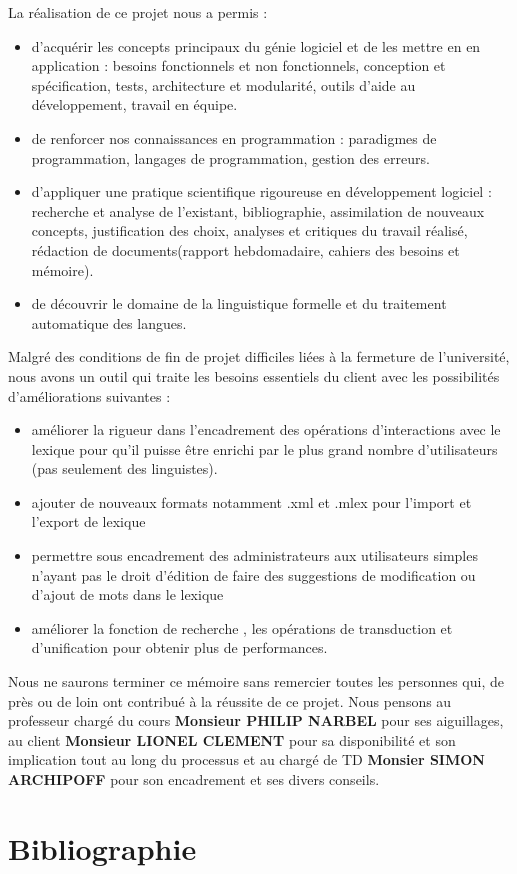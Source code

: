 \documentclass[a4paper, 12pt]{article}
\begin{document}
{La réalisation de ce projet nous a permis :
\begin{itemize}
    \item d'acquérir les concepts principaux du génie logiciel et de les mettre en en application : besoins fonctionnels et non fonctionnels, conception et spécification, tests, architecture et modularité, outils d'aide au développement, travail en équipe.
    \item de renforcer nos connaissances en programmation : paradigmes de programmation, langages de programmation, gestion des erreurs.
    \item d'appliquer une pratique scientifique rigoureuse en développement logiciel : recherche et analyse de l'existant, bibliographie, assimilation de nouveaux concepts, justification des choix, analyses et critiques du travail réalisé, rédaction de documents(rapport hebdomadaire, cahiers des besoins et mémoire).
    \item de découvrir le domaine de la linguistique formelle et du traitement automatique des langues. 
    \end{itemize}{}\par}
{Malgré des conditions de fin de projet difficiles liées à la fermeture de l'université, nous avons un outil qui traite les besoins essentiels du client avec les possibilités d'améliorations suivantes :
    \begin{itemize}
        \item améliorer la rigueur dans l'encadrement des opérations d'interactions avec le lexique pour qu'il puisse être enrichi par le plus grand nombre d'utilisateurs (pas seulement des linguistes). 
        \item ajouter de nouveaux formats notamment .xml et .mlex pour l'import et l'export de lexique
        \item permettre sous encadrement des administrateurs aux utilisateurs simples n'ayant pas le droit d'édition  de faire des suggestions de modification ou d'ajout de mots dans le lexique 
        \item améliorer la fonction de recherche , les opérations de transduction et d'unification pour obtenir plus de performances.
    \end{itemize}{}\par}
    
    Nous ne saurons terminer ce mémoire sans remercier toutes les personnes qui, de près ou de loin ont contribué à la réussite de ce projet. Nous pensons au professeur chargé du cours \textbf{Monsieur PHILIP NARBEL} pour ses aiguillages, au client \textbf{Monsieur LIONEL CLEMENT} pour sa disponibilité et son implication tout au long du processus et au chargé de TD \textbf{Monsier SIMON ARCHIPOFF} pour son encadrement et ses divers conseils.
\newpage
\section{Bibliographie}
\nocite{*}
\printbibliography
\end{document}
